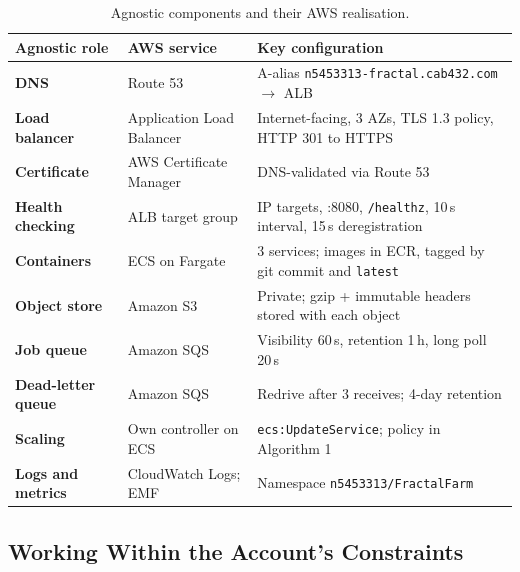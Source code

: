 \documentclass[a4paper,12pt]{article}
\begin{document}
\begin{table}[H]
\centering
\small
\begin{tabularx}{\linewidth}{>{\bfseries}p{3.2cm} >{\raggedright\arraybackslash}p{4.4cm} X}
\toprule
Agnostic role & AWS service & Key configuration \\
\midrule
DNS & Route 53 & A-alias \texttt{n5453313-fractal.cab432.com} $\rightarrow$ ALB \\
Load balancer & Application Load Balancer & Internet-facing, 3 AZs, TLS 1.3 policy, HTTP 301 to HTTPS \\
Certificate & AWS Certificate Manager & DNS-validated via Route 53 \\
Health checking & ALB target group & IP targets, :8080, \texttt{/healthz}, 10\,s interval, 15\,s deregistration \\
Containers & ECS on Fargate & 3 services; images in ECR, tagged by git commit and \texttt{latest} \\
Object store & Amazon S3 & Private; gzip + immutable headers stored with each object \\
Job queue & Amazon SQS & Visibility 60\,s, retention 1\,h, long poll 20\,s \\
Dead-letter queue & Amazon SQS & Redrive after 3 receives; 4-day retention \\
Scaling & Own controller on ECS & \texttt{ecs:UpdateService}; policy in Algorithm 1 \\
Logs and metrics & CloudWatch Logs; EMF & Namespace \texttt{n5453313/FractalFarm} \\
\bottomrule
\end{tabularx}
\caption{Agnostic components and their AWS realisation.}
\label{tab:mapping}
\end{table}

\subsection{Working Within the Account's Constraints}
\end{document}
